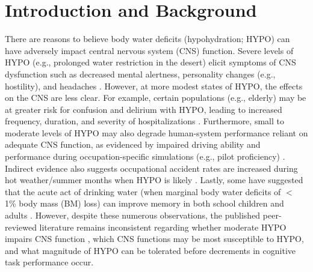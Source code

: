 \chapter{Introduction and Background}
There are reasons to believe body water deficits (hypohydration; HYPO) can have adversely impact central nervous system (CNS) function. Severe levels of HYPO (e.g., prolonged water restriction in the desert) elicit symptoms of CNS dysfunction such as decreased mental alertness, personality changes (e.g., hostility), and headaches \cite{adolf_physiology_1947, king_brief_1878}. However, at more modest states of HYPO, the effects on the CNS are less clear. For example, certain populations (e.g., elderly) may be at greater risk for confusion and delirium with HYPO, leading to increased frequency, duration, and severity of hospitalizations \cite{inouye_delirium_2006,warren_burden_1994}. Furthermore, small to moderate levels of HYPO may also degrade human-system performance reliant on adequate CNS function, as evidenced by impaired driving ability \cite{watson_mild_2015} and performance during occupation-specific simulations (e.g., pilot proficiency) \cite{lindseth_effects_2013}. Indirect evidence also suggests occupational accident rates are increased during hot weather/summer months when HYPO is likely \cite{kenefick_hydration_2007, kenefick_dehydration_2012}. Lastly, some have suggested that the acute act of drinking water (when marginal body water deficits of ${<}$ 1\% body mass (BM) loss) can improve memory in both school children and adults \cite{benton_effect_2009,benton_small_2015,benton_minor_2016,fadda_effects_2012}. However, despite these numerous observations, the published peer-reviewed literature remains inconsistent regarding whether moderate HYPO impairs CNS function \cite{ely_hypohydration_2013,adam_hydration_2008,danci_voluntary_2009}, which CNS functions may be most susceptible to HYPO, and what magnitude of HYPO can be tolerated before decrements in cognitive task performance occur.



